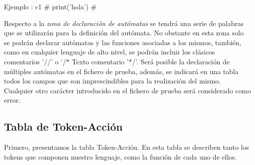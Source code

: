 \documentclass[12pt,a4paper]{article}
\begin{document}
\begin{center}
	Ejemplo : c1 $\#$ print('hola') $\#$
\end{center}

Respecto a la \textit{zona de declaración de autómatas} se tendrá una serie de palabras que se utilizarán para la definición del autómata. No obstante en esta zona solo se podrán declarar autómatas y las funciones asociadas a los mismos, también, como en cualquier lenguaje de alto nivel, se podrán incluir los clásicos comentarios '//' o '/$\ast$ Texto comentario '$\ast$/'.
\newline 
\newline
Será posible la declaración de múltiples autómatas en el fichero de prueba, además, se indicará en una tabla todos los campos que son imprescindibles para la realización del mismo.
Cualquier otro carácter introducido en el fichero de prueba será considerado como error.

\subsection{Tabla de Token-Acción}
Primero, presentamos la tabla Token-Acción. En esta tabla se describen tanto los tokens que componen nuestro lenguaje, como la función de cada uno de ellos.
\end{document}
